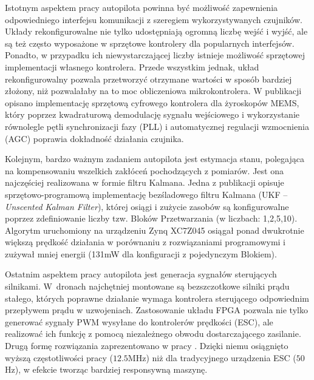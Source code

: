 Istotnym aspektem pracy autopilota powinna być możliwość zapewnienia odpowiedniego interfejsu komunikacji z szeregiem wykorzystywanych czujników. 
Układy rekonfigurowalne nie tylko udostępniają ogromną liczbę wejść i wyjść, ale są też często wyposażone w sprzętowe kontrolery dla popularnych interfejsów. 
Ponadto, w przypadku ich niewystarczającej liczby istnieje możliwość sprzętowej implementacji własnego kontrolera. 
Przede wszystkim jednak, układ rekonfigurowalny pozwala przetworzyć otrzymane wartości w sposób bardziej złożony, niż pozwalałaby na to moc obliczeniowa mikrokontrolera. 
W publikacji \cite{MEMS} opisano implementację sprzętową cyfrowego kontrolera dla żyroskopów MEMS, który poprzez kwadraturową demodulację sygnału wejściowego i wykorzystanie równolegle pętli synchronizacji fazy (PLL) i automatycznej regulacji wzmocnienia (AGC) poprawia dokładność działania czujnika.

Kolejnym, bardzo ważnym zadaniem autopilota jest estymacja stanu, polegająca na kompensowaniu wszelkich zakłóceń pochodzących z pomiarów. 
Jest ona najczęściej realizowana w formie filtru Kalmana. 
Jedna z publikacji \cite{SohKalman} opisuje sprzętowo-programową implementację bezśladowego filtru Kalmana (UKF -- \textit{Unscented Kalman Filter}), której osiągi i zużycie zasobów są konfigurowalne poprzez zdefiniowanie liczby tzw. Bloków Przetwarzania (w liczbach: 1,2,5,10). 
Algorytm uruchomiony na urządzeniu Zynq XC7Z045 osiągał ponad dwukrotnie większą prędkość działania w porównaniu z rozwiązaniami programowymi i zużywał mniej energii (131mW dla konfiguracji z pojedynczym Blokiem). 

Ostatnim aspektem pracy autopilota jest generacja sygnałów sterujących silnikami. 
W~dronach najchętniej montowane są bezszczotkowe silniki prądu stałego, których poprawne działanie wymaga kontrolera sterującego odpowiednim przepływem prądu w uzwojeniach.
Zastosowanie układu FPGA pozwala nie tylko generować sygnały PWM wysyłane do kontrolerów prędkości (ESC), ale realizować ich funkcję z pomocą niezależnego obwodu dostarczającego zasilanie. 
Drugą formę rozwiązania zaprezentowano w pracy \cite{ESC}. 
Dzięki niemu osiągnięto wyższą częstotliwości pracy ($12.5$MHz) niż dla tradycyjnego urządzenia ESC ($50$Hz), w efekcie tworząc bardziej responsywną maszynę.

